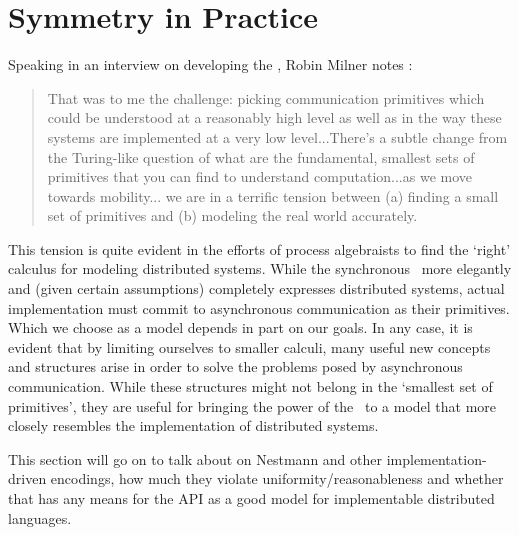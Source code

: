 \section{Symmetry in Practice}

Speaking in an interview on developing the \picalc, Robin Milner notes \cite{miln03}:
\begin{quote}
That was to me the challenge: picking communication primitives which could be understood at a reasonably high level as well as in the way these systems are implemented at a very low level...There's a subtle change from the Turing-like question of what are the fundamental, smallest sets of primitives that you can find to understand computation...as we move towards mobility... we are in a terrific tension between (a) finding a small set of primitives and (b) modeling the real world accurately.
\end{quote}
This tension is quite evident in the efforts of process algebraists to find the `right' calculus for modeling distributed systems.  
While the synchronous \picalc\ more elegantly and (given certain assumptions) completely expresses distributed systems, actual implementation must commit to asynchronous communication as their primitives.  
Which we choose as a model depends in part on our goals.  
In any case, it is evident that by limiting ourselves to smaller calculi, many useful new concepts and structures arise in order to solve the problems posed by asynchronous communication.  
While these structures might not belong in the `smallest set of primitives', they are useful for bringing the power of the \picalc\ to a model that more closely resembles the implementation of distributed systems.

This section will go on to talk about on Nestmann and other implementation-driven encodings, how much they violate uniformity/reasonableness and whether that has any means for the API as a good model for implementable distributed languages.
